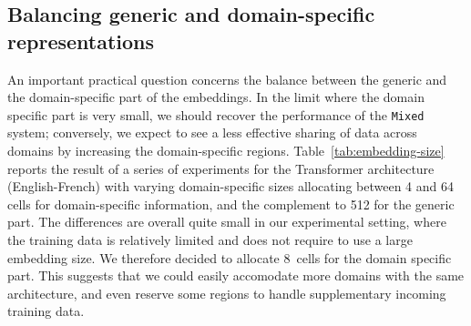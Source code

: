 \documentclass[a4paper]{article}
\newcommand{\fyTodo}[1]{\Todo[FY:]{\textcolor{orange}{#1}}}
\newcommand{\fyDone}[1]{\done[FY]\Todo[FY:]{\textcolor{orange}{#1}}}
\begin{document}

\subsection{Balancing generic and domain-specific representations\label{secc:region_size}}

An important practical question concerns the balance between the generic and the domain-specific part of the embeddings. In the limit where the domain specific part is very small, we should recover the performance of the \texttt{Mixed} system; conversely, we expect to see a less effective sharing of data across domains by increasing the domain-specific regions. Table~\ref{tab:embedding-size} reports the result of  a series of experiments for the Transformer architecture (English-French) with varying domain-specific sizes allocating between 4 and 64 cells for domain-specific information, and the complement to 512 for the generic part. The differences are overall quite small in our experimental setting, where the training data is relatively limited and does not require to use a large embedding size. We therefore decided to allocate $8$~cells for the domain specific part. This suggests that we could easily accomodate more domains with the same architecture, and even reserve some regions to handle supplementary incoming training data.  
\fyDone{Given the ways embeddings are computed, why not add more domains, and test robustness agains data presentation order ?}
\end{document}
